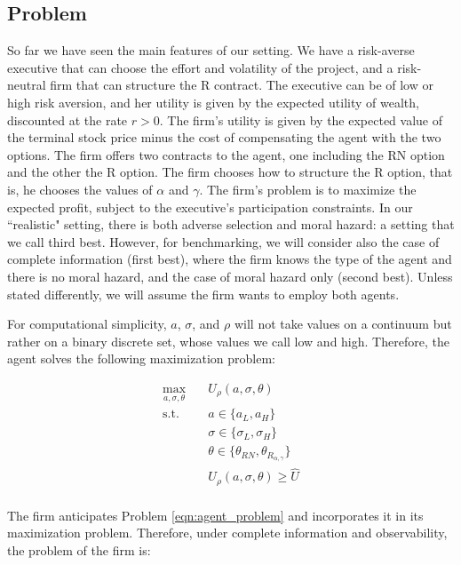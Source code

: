 \subsection{Problem}
So far we have seen the main features of our setting. We have a risk-averse executive that can choose the effort and volatility of the project, and a risk-neutral firm that can structure the R contract. The executive can be of low or high risk aversion, and her utility is given by the expected utility of wealth, discounted at the rate $r>0$. The firm's utility is given by the expected value of the terminal stock price minus the cost of compensating the agent with the two options. The firm offers two contracts to the agent, one including the RN option and the other the R option. The firm chooses how to structure the R option, that is, he chooses the values of $\alpha$ and $\gamma$. The firm's problem is to maximize the expected profit, subject to the executive's participation constraints. In our ``realistic" setting, there is both adverse selection and moral hazard: a setting that we call third best. However, for benchmarking, we will consider also the case of complete information (first best), where the firm knows the type of the agent and there is no moral hazard, and the case of moral hazard only (second best). Unless stated differently, we will assume the firm wants to employ both agents.

For computational simplicity, $a$, $\sigma$, and $\rho$ will not take values on a continuum but rather on a binary discrete set, whose values we call low and high. Therefore, the agent solves the following maximization problem:

\begin{equation}
    \label{eqn:agent_problem}
    \begin{aligned}
    \max_{a, \sigma, \theta} \quad & U_\rho (a, \sigma, \theta) \\
    \textrm{s.t.}       \quad & a \in \{ a_L, a_H \} \\
                        \quad & \sigma \in \{ \sigma_L, \sigma_H \} \\
                        \quad & \theta \in \{\theta_{RN}, \theta_{R_{\alpha, \gamma}} \} \\
                        \quad & U_\rho(a, \sigma, \theta) \ge \hat{U}  \\
    \end{aligned}
\end{equation}

The firm anticipates Problem \ref*{eqn:agent_problem} and incorporates it in its maximization problem. Therefore, under complete information and observability, the problem of the firm is:

